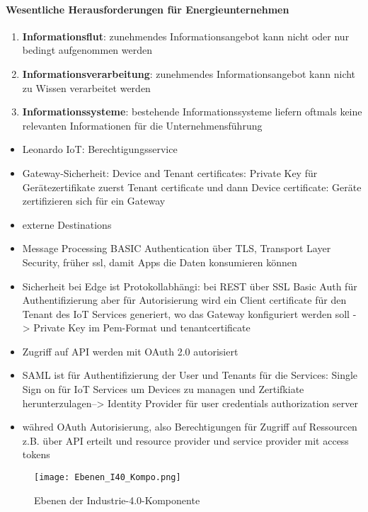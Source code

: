 \paragraph{Wesentliche Herausforderungen für Energieunternehmen \citep[S. 21]{Doleski2016}}
\begin{enumerate}
  \item \textbf{Informationsflut}: zunehmendes Informationsangebot kann nicht oder nur bedingt aufgenommen werden
  \item \textbf{Informationsverarbeitung}: zunehmendes Informationsangebot kann nicht zu Wissen verarbeitet werden
  \item \textbf{Informationssysteme}: bestehende Informationssysteme liefern oftmals keine relevanten Informationen für die Unternehmensführung
\end{enumerate}

\begin{itemize}
  \item Leonardo IoT: Berechtigungsservice
  \item Gateway-Sicherheit: Device and Tenant certificates: Private Key für Gerätezertifikate zuerst Tenant certificate und dann Device certificate: Geräte zertifizieren sich für ein Gateway
  \item externe Destinations
  \item Message Processing BASIC Authentication über TLS, Transport Layer Security, früher ssl, damit Apps die Daten konsumieren können
  \item Sicherheit bei Edge ist Protokollabhängi: bei REST über SSL Basic Auth für Authentifizierung aber für Autorisierung wird ein Client certificate für den Tenant des IoT Services generiert, wo das Gateway konfiguriert werden soll -> Private Key im Pem-Format und tenantcertificate
  \item Zugriff auf API werden mit OAuth 2.0 autorisiert
  \item SAML ist für Authentifizierung der User und Tenants für die Services: Single Sign on für IoT Services um Devices zu managen und Zertifkiate herunterzulagen--> Identity Provider für user credentials authorization server
  \item währed OAuth Autorisierung, also Berechtigungen für Zugriff auf Ressourcen z.B. über API erteilt  und resource provider und service provider mit access tokens
\end{itemize}


\begin{figure}[h]
  \centering
  \texttt{[image: Ebenen\_I40\_Kompo.png]}
  \caption[Ebenen der Industrie-4.0-Komponente]{Ebenen der Industrie-4.0-Komponente \citep[S. 52]{BITKOM2015}}
  \label{ebenen_i40}
\end{figure}
